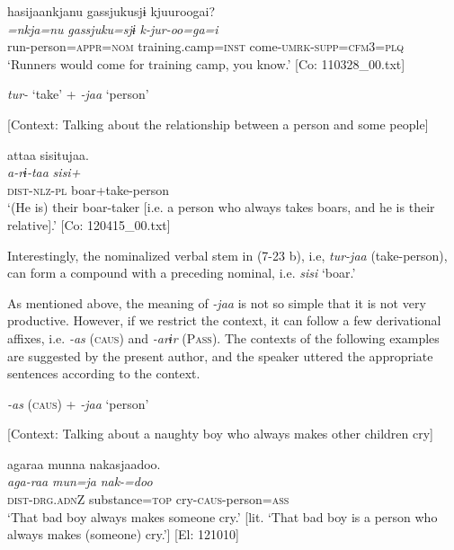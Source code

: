 \glll  hasijaankjanu  {\textbar}gassjuku{\textbar}sjɨ  kjuuroogai?\\
\textit{=nkja=nu}  \textit{gassjuku=sjɨ}  \textit{k-jur-oo=ga=i}\\
run-person=\textsc{appr}=\textsc{nom}  training.camp=\textsc{inst}  come-\textsc{umrk}-\textsc{supp}=\textsc{cfm}3=\textsc{plq}\\
\glt ‘Runners would come for training camp, you know.’ [Co: 110328\_00.txt]

\ex \label{ex:7:b}\textit{tur-} ‘take’ + \textit{{}-jaa} ‘person’

    [Context: Talking about the relationship between a person and some people]

\glll  attaa   sisitujaa.\\
\textit{a-rɨ-taa}  \textit{sisi+}\\
\textsc{dist}-\textsc{nlz}-\textsc{pl}  boar+take-person\\
\glt ‘(He is) their boar-taker [i.e. a person who always takes boars, and he is their relative].’ [Co: 120415\_00.txt]
\z
\z

Interestingly, the nominalized verbal stem in (7-23 b), i.e, \textit{tur-jaa} (take-person), can form a compound with a preceding nominal, i.e. \textit{sisi} ‘boar.’

As mentioned above, the meaning of \textit{{}-jaa} is not so simple that it is not very productive. However, if we restrict the context, it can follow a few derivational affixes, i.e. \textit{{}-as} (\textsc{caus}) and \textit{{}-arɨr} (P\textsc{ass}). The contexts of the following examples are suggested by the present author, and the speaker uttered the appropriate sentences according to the context.

\ea \label{ex:7:24}
\ea \label{ex:7:24a}\textit{{}-as} (\textsc{caus}) + \textit{{}-jaa} ‘person’

    [Context: Talking about a naughty boy who always makes other children cry]

\glll  agaraa  munna  nakasjaadoo.\\
\textit{aga-raa}  \textit{mun=ja}  \textit{nak-=doo}\\
\textsc{dist}-\textsc{drg}.\textsc{adn}Z  substance=\textsc{top}  cry-\textsc{caus}-person=\textsc{ass}\\
\glt ‘That bad boy always makes someone cry.’ [lit. ‘That bad boy is a person who always makes (someone) cry.’] [El: 121010]

